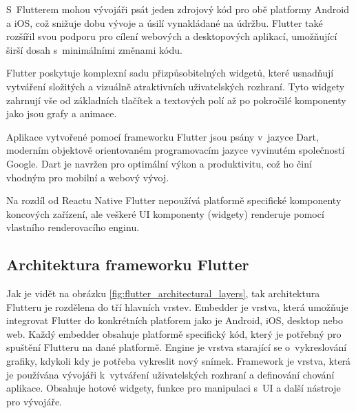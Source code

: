 S~Flutterem mohou vývojáři psát jeden zdrojový kód pro obě platformy Android a iOS, což snižuje dobu vývoje a úsilí 
vynakládané na údržbu. Flutter také rozšířil svou podporu pro cílení webových a desktopových aplikací, umožňující širší dosah s~minimálními změnami kódu. \cite{flutter}

Flutter poskytuje komplexní sadu přizpůsobitelných widgetů, které usnadňují vytváření složitých a vizuálně 
atraktivních uživatelských rozhraní. Tyto widgety zahrnují vše od základních tlačítek a textových polí až po 
pokročilé komponenty jako jsou grafy a animace. \cite{flutterWidgets2}

Aplikace vytvořené pomocí frameworku Flutter jsou psány v~jazyce Dart, moderním objektově orientovaném programovacím jazyce 
vyvinutém společností Google. Dart je navržen pro optimální výkon a produktivitu, což ho činí vhodným pro mobilní a
webový vývoj. \cite{dart}

Na rozdíl od Reactu Native Flutter nepoužívá platformě specifické komponenty koncových zařízení, ale veškeré UI komponenty (widgety)
renderuje pomocí vlastního renderovacího enginu. \cite{flutterRenderingModel}


\subsection*{Architektura frameworku Flutter} 
Jak je vidět na obrázku \ref{fig:flutter_architectural_layers}, tak architektura Flutteru je rozdělena do tří hlavních vrstev. \cite{flutterArchOverview}
Embedder je vrstva, která umožňuje integrovat Flutter do konkrétních platforem jako je Android, iOS, desktop nebo web. 
Každý embedder obsahuje platformě specifický kód, který je potřebný pro spuštění Flutteru na dané platformě.
Engine je vrstva starající se o~vykreslování grafiky, kdykoli kdy je potřeba vykreslit nový snímek. \cite{flutterArchOverview} 
Framework je vrstva, která je používána vývojáři k~vytváření uživatelských rozhraní a definování chování aplikace. 
Obsahuje hotové widgety, funkce pro manipulaci s~UI a další nástroje pro vývojáře. \cite{flutterArchOverview} 


